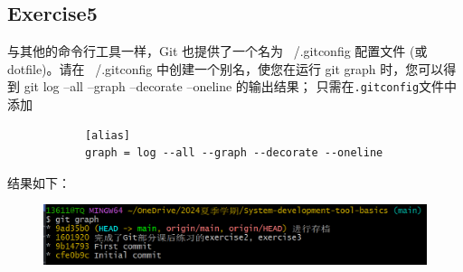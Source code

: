 \documentclass{article}
\begin{document}
        \subsection{Exercise5}
        与其他的命令行工具一样，Git 也提供了一个名为 ~/.gitconfig 配置文件 
        (或 dotfile)。请在 ~/.gitconfig 中创建一个别名，使您在运行
         git graph 时，您可以得到 git log --all --graph --decorate --oneline 
         的输出结果；
         只需在\verb|.gitconfig|文件中添加
         \begin{verbatim}
            [alias]
            graph = log --all --graph --decorate --oneline
        \end{verbatim}
        结果如下：
        \begin{figure}[H]
            \centering
            \includegraphics[scale=0.8]{7.png}
        \end{figure}
\end{document}

